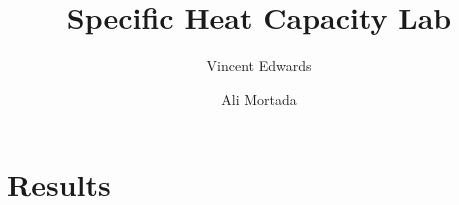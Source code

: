 \documentclass[12pt]{iopart} %
\title{Specific Heat Capacity Lab}
\author{Vincent Edwards}
\author{Ali Mortada}
\begin{document}
\section{Results}
\end{document}
